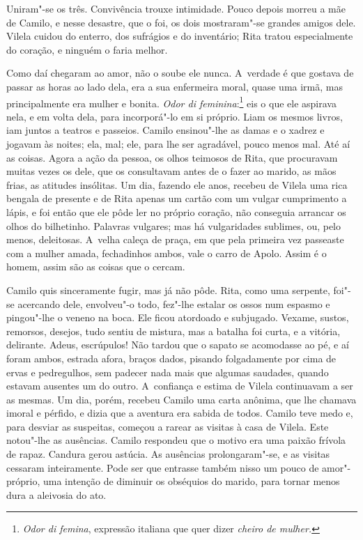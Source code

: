 \begin{linenumbers}
Uniram"-se os três. Convivência trouxe intimidade. Pouco depois morreu a
mãe de Camilo, e nesse desastre, que o foi, os dois mostraram"-se grandes
amigos dele. Vilela cuidou do enterro, dos sufrágios e do inventário;
Rita tratou especialmente do coração, e ninguém o faria melhor.

Como daí chegaram ao amor, não o soube ele nunca. A~verdade é que
gostava de passar as horas ao lado dela, era a sua enfermeira moral,
quase uma irmã, mas principalmente era mulher e bonita. \emph{Odor di
feminina}:\footnote{\emph{Odor di femina}, expressão italiana que quer
  dizer \emph{cheiro de mulher.}} eis o que ele aspirava nela,
e em volta dela, para incorporá"-lo em si próprio. Liam os mesmos livros,
iam juntos a teatros e passeios. Camilo ensinou"-lhe as damas e o xadrez
e jogavam às noites; ela, mal; ele, para lhe ser agradável, pouco menos
mal. Até aí as coisas. Agora a ação da pessoa, os olhos teimosos de
Rita, que procuravam muitas vezes os dele, que os consultavam antes de o
fazer ao marido, as mãos frias, as atitudes insólitas. Um dia, fazendo
ele anos, recebeu de Vilela uma rica bengala de presente e de Rita
apenas um cartão com um vulgar cumprimento a lápis, e foi então que ele
pôde ler no próprio coração, não conseguia arrancar os olhos do
bilhetinho. Palavras vulgares; mas há vulgaridades sublimes, ou, pelo
menos, deleitosas. A~velha caleça de praça, em que pela primeira vez
passeaste com a mulher amada, fechadinhos ambos, vale o carro de Apolo.
Assim é o homem, assim são as coisas que o cercam.

Camilo quis sinceramente fugir, mas já não pôde. Rita, como uma
serpente, foi"-se acercando dele, envolveu"-o todo, fez"-lhe estalar os
ossos num espasmo e pingou"-lhe o veneno na boca. Ele ficou atordoado e
subjugado. Vexame, sustos, remorsos, desejos, tudo sentiu de mistura,
mas a batalha foi curta, e a vitória, delirante. Adeus, escrúpulos! Não
tardou que o sapato se acomodasse ao pé, e aí foram ambos, estrada
afora, braços dados, pisando folgadamente por cima de ervas e
pedregulhos, sem padecer nada mais que algumas saudades, quando estavam
ausentes um do outro. A~confiança e estima de Vilela continuavam a ser
as mesmas. Um dia, porém, recebeu Camilo uma carta anônima, que lhe
chamava imoral e pérfido, e dizia que a aventura era sabida de todos.
Camilo teve medo e, para desviar as suspeitas, começou a rarear as
visitas à casa de Vilela. Este notou"-lhe as ausências. Camilo respondeu
que o motivo era uma paixão frívola de rapaz. Candura gerou astúcia. As
ausências prolongaram"-se, e as visitas cessaram inteiramente. Pode ser
que entrasse também nisso um pouco de amor"-próprio, uma intenção de
diminuir os obséquios do marido, para tornar menos dura a aleivosia do
ato.


\end{linenumbers}
